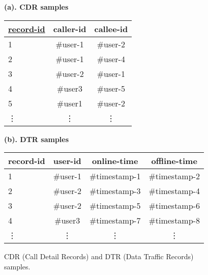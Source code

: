 \documentclass{article}
\begin{document}
\renewcommand{\arraystretch}{1.2}
\begin{figure}[tbp]
\centering
\centerline{\bf (a). CDR samples}
\vspace{1.5mm}
\begin{tabular}{|l|c|c|}
\hline
\cline{1-1}
\underline{\textbf{record-id}} & \textbf{caller-id} & \textbf{callee-id} \\\hline 
1                                              & \#user-1           & \#user-2           \\\hline
2                                              & \#user-1           & \#user-4           \\\hline
3                                              & \#user-2           & \#user-1           \\\hline
4                                              & \#user3            & \#user-5\\\hline
5                                              & \#user1            & \#user-2\\\hline
\vdots                                             & \vdots           & \vdots\\\hline
\end{tabular}
 
\vspace{3mm}
\centering
\centerline{\bf (b). DTR samples}
\vspace{1.5mm}
\begin{tabular}{|l|c|c|c|}
\hline
\cline{1-1}
\textbf{record-id} & \textbf{user-id} & \textbf{online-time} & \textbf{offline-time} \\\hline
1    & \#user-1           & \#timestamp-1  & \#timestamp-2           \\\hline
2    & \#user-2           & \#timestamp-3  & \#timestamp-4           \\\hline
3    & \#user-2           & \#timestamp-5  & \#timestamp-6           \\\hline
4    & \#user3            & \#timestamp-7  & \#timestamp-8           \\\hline
\vdots & \vdots           & \vdots          &\vdots\\\hline
\end{tabular}
\vspace{1.5mm}
\caption{CDR (Call Detail Records) and DTR (Data Traffic Records) samples.}
\end{figure}
\end{document}
